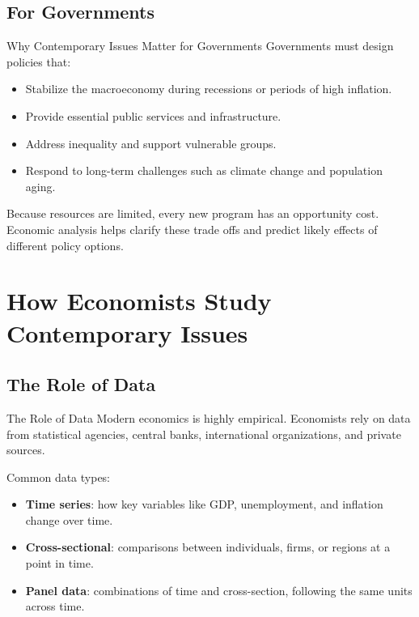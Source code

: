 \documentclass[aspectratio=169]{beamer}
\begin{document}
\subsection{For Governments}

\begin{frame}{Why Contemporary Issues Matter for Governments}
  \transfade
  Governments must design policies that:
  \begin{itemize}[<+->]
    \item Stabilize the macroeconomy during recessions or periods of high inflation.
    \item Provide essential public services and infrastructure.
    \item Address inequality and support vulnerable groups.
    \item Respond to long-term challenges such as climate change and population aging.
  \end{itemize}

  \vspace{0.3cm}
  Because resources are limited, every new program has an opportunity cost. Economic analysis
  helps clarify these trade offs and predict likely effects of different policy options.
\end{frame}

\section{How Economists Study Contemporary Issues}

\subsection{The Role of Data}

\begin{frame}{The Role of Data}
  \transfade
  Modern economics is highly empirical. Economists rely on data from statistical agencies,
  central banks, international organizations, and private sources.

  \vspace{0.2cm}
  Common data types:
  \begin{itemize}[<+->]
    \item \textbf{Time series}: how key variables like GDP, unemployment, and inflation change over time.
    \item \textbf{Cross-sectional}: comparisons between individuals, firms, or regions at a point in time.
    \item \textbf{Panel data}: combinations of time and cross-section, following the same units across time.
  \end{itemize}
\end{frame}
\end{document}
